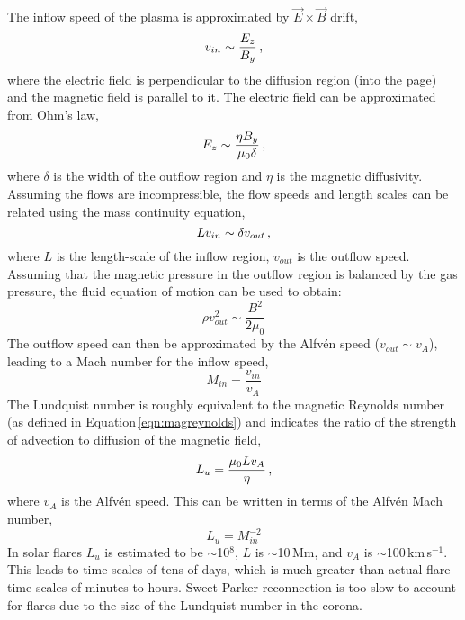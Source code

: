 The inflow speed of the plasma is approximated by $\vec{E}\times\vec{B}$ drift, 
\begin{equation}
v_{in} \sim \frac{E_{z}}{B_{y}} \mbox{\,,}
\end{equation}
where the electric field is perpendicular to the diffusion region (into the page) and the magnetic field is parallel to it. The electric field can be approximated from Ohm's law,
\begin{equation}
E_z \sim \frac{\eta B_y}{\mu_0 \delta} \mbox{\,,} 
\end{equation}
where $\delta$ is the width of the outflow region and $\eta$ is the magnetic diffusivity. Assuming the flows are incompressible, the flow speeds and length scales can be related using the mass continuity equation,
\begin{equation}
L v_{in} \sim \delta v_{out} \mbox{\,,}
\end{equation}
where $L$ is the length-scale of the inflow region, $v_{out}$ is the outflow speed. Assuming that the magnetic pressure in the outflow region is balanced by the gas pressure, the fluid equation of motion can be used to obtain:
\begin{equation}
\rho v_{out}^2 \sim \frac{B^2}{2 \mu_0}  
\end{equation}
The outflow speed can then be approximated by the Alfv\'en speed ($v_{out} \sim v_A$), leading to a Mach number for the inflow speed,
\begin{equation}
M_{in}=\frac{v_{in}}{v_A}  
\end{equation}
The Lundquist number is roughly equivalent to the magnetic Reynolds number (as defined in Equation\,\ref{eqn:magreynolds}) and indicates the ratio of the strength of advection to diffusion of the magnetic field,
\begin{equation}
L_u = \frac{\mu_0 L v_A}{\eta} \mbox{\,,}
\end{equation}
where $v_A$ is the Alfv\'en speed. This can be written in terms of the Alfv\'en Mach number,
\begin{equation}
L_u = M_{in}^{-2}  
\end{equation}
In solar flares $L_u$ is estimated to be $\sim$10$^8$, $L$ is $\sim$10\,Mm, and $v_A$ is $\sim$100\,km\,s$^{-1}$. This leads to time scales of tens of days, which is much greater than actual flare time scales of minutes to hours. Sweet-Parker reconnection is too slow to account for flares due to the size of the Lundquist number in the corona. 

